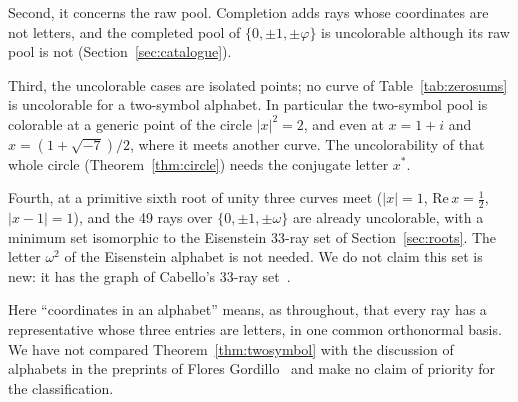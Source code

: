 Second, it concerns the raw pool.  Completion adds rays whose coordinates are not letters, and
the completed pool of $\{0,\pm1,\pm\varphi\}$ is uncolorable although its raw pool is not
(Section~\ref{sec:catalogue}).

Third, the uncolorable cases are isolated points; no curve of Table~\ref{tab:zerosums} is
uncolorable for a two-symbol alphabet.  In particular the two-symbol pool is colorable at a
generic point of the circle $|x|^2=2$, and even at $x=1+i$ and $x=(1+\sqrt{-7})/2$, where it
meets another curve.  The uncolorability of that whole circle (Theorem~\ref{thm:circle}) needs the
conjugate letter $x^{*}$.

Fourth, at a primitive sixth root of unity three curves
meet ($|x|=1$, $\mathrm{Re}\,x=\tfrac12$, $|x-1|=1$), and the 49 rays over $\{0,\pm1,\pm\omega\}$
are already uncolorable, with a minimum set isomorphic to the Eisenstein 33-ray set of
Section~\ref{sec:roots}.  The letter $\omega^2$ of the Eisenstein alphabet is not needed.  We do
not claim this set is new: it has the graph of Cabello's 33-ray set~\cite{Cabello2025simplest}.

Here ``coordinates in an alphabet'' means, as throughout, that every ray has a representative
whose three entries are letters, in one common orthonormal basis.  We have not compared
Theorem~\ref{thm:twosymbol} with the discussion of alphabets in the preprints of Flores
Gordillo~\cite{FloresGordillo2026} and make no claim of priority for the classification.
